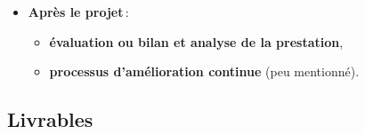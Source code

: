 \begin{frame}[allowframebreaks]
\begin{itemize}
						\item \textbf{Après le projet}\,: 
							\begin{itemize}
							\item \textbf{évaluation ou bilan et analyse de la prestation},
								
						\item \textbf{processus d'amélioration continue} (peu mentionné).
								
						\end{itemize}		
							\end{itemize}
						
					\end{frame}
							
						
						 \subsection{Livrables} 
